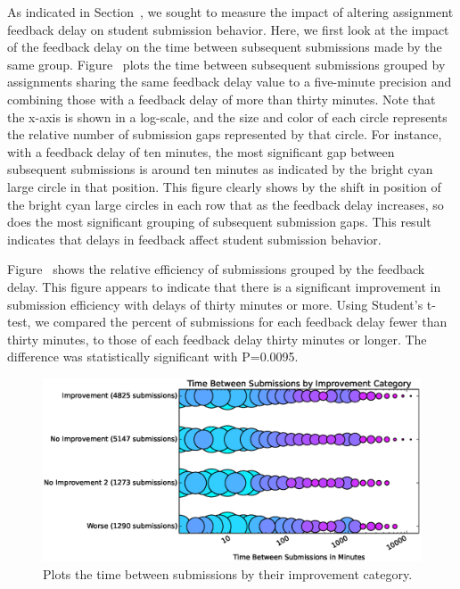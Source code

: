 As indicated in Section~, we sought to measure the impact
of altering assignment feedback delay on student submission behavior. Here, we
first look at the impact of the feedback delay on the time between subsequent
submissions made by the same group. Figure~ plots the
time between subsequent submissions grouped by assignments sharing the same
feedback delay value to a five-minute precision and combining those with a
feedback delay of more than thirty minutes. Note that the x-axis is shown in a
log-scale, and the size and color of each circle represents the relative number
of submission gaps represented by that circle. For instance, with a feedback
delay of ten minutes, the most significant gap between subsequent submissions
is around ten minutes as indicated by the bright cyan large circle in that
position. This figure clearly shows by the shift in position of the bright cyan
large circles in each row that as the feedback delay increases, so does the
most significant grouping of subsequent submission gaps. This result indicates
that delays in feedback affect student submission behavior.

Figure~ shows the relative efficiency of
submissions grouped by the feedback delay. This figure appears to indicate that
there is a significant improvement in submission efficiency with delays of
thirty minutes or more. Using Student's t-test, we compared the percent of
\imp{} submissions for each feedback delay fewer than thirty minutes, to those
of each feedback delay thirty minutes or longer. The difference was
statistically significant with P=0.0095.

\begin{figure}[!t]
\centering \includegraphics[width=5.75in]{graphs/Time_Between_Submissions_by_Improvement_Category.eps}
\caption{Plots the time between submissions by their improvement category.}
\end{figure}

